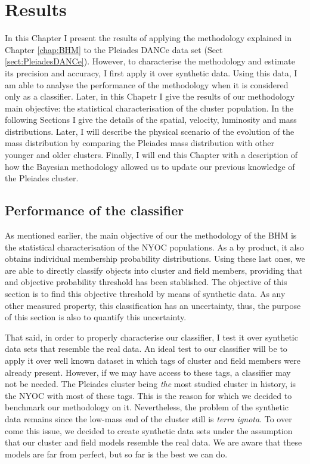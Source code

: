 \chapter{Results}
\label{chap:Results}
In this Chapter I present the results of applying the methodology explained in Chapter \ref{chap:BHM} to the Pleiades DANCe data set (Sect \ref{sect:PleiadesDANCe}). However, to characterise the methodology and estimate its precision and accuracy, I first apply it over synthetic data. Using this data, I am able to analyse the performance of the methodology when it is considered only as a classifier. Later, in this Chapetr I give the results of our methodology main objective: the statistical characterisation of the cluster population. In the following Sections I give the details of the spatial, velocity, luminosity and mass distributions. Later, I will describe the physical scenario of the evolution of the mass distribution by comparing the Pleiades mass distribution with other younger and older clusters. Finally, I will end this Chapter with a description of how the Bayesian methodology allowed us to update our previous knowledge of the Pleiades cluster.

\section{Performance of the classifier}
\label{classifier}
As mentioned earlier, the main objective of our the methodology of the BHM is the statistical characterisation of the NYOC populations. As a by product, it also obtains individual membership probability distributions. Using these last ones, we are able to directly classify objects into cluster and field members, providing that and objective probability threshold has been stablished. The objective of this section is to find this objective threshold by means of synthetic data. As any other measured property, this classification has an uncertainty, thus, the purpose of this section is also to quantify this uncertainty. 

That said, in order to properly characterise our classifier, I test it over synthetic data sets that resemble the real data. An ideal test to our classifier will be to apply it over well known dataset in which tags of cluster and field members were already present. However, if we may have access to these tags, a classifier may not be needed. The Pleiades cluster being \emph{the} most studied cluster in history, is the  NYOC with most of these tags. This is the reason for which we decided to benchmark our methodology on it. Nevertheless, the problem of the synthetic data remains since the low-mass end of the cluster still is \emph{terra ignota}. To over come this issue, we decided to create synthetic data sets under the assumption that our cluster and field models resemble the real data.  We are aware that these models are far from perfect, but so far is the best we can do. 

